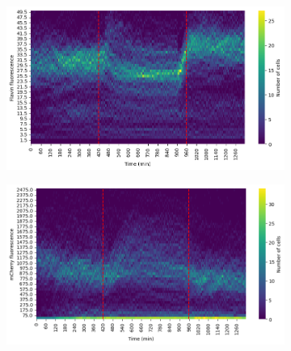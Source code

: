 \begin{figure}
  \centering
  \begin{subfigure}[htpb]{0.5\textwidth}
   \centering
   \includegraphics[width=\textwidth]{19972_distribs_flavin.png}
   \caption{
   }
   \label{fig:biology-starvation-histogram-flavin}
  \end{subfigure}%
  \begin{subfigure}[htpb]{0.5\textwidth}
   \centering
   \includegraphics[width=\textwidth]{19972_distribs_mCherry.png}
   \caption{
   }
   \label{fig:biology-starvation-histogram-mCherry}
  \end{subfigure}


\end{figure}
